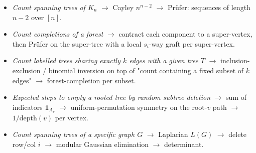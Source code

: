 
\begin{itemize}[nosep]
  \item \emph{Count spanning trees of \(K_n\)} \(\to\) Cayley \(n^{n-2}\)
        \(\to\) Pr\"ufer: sequences of length \(n-2\) over \([n]\).
  \item \emph{Count completions of a forest} \(\to\) contract each
        component to a super-vertex, then Pr\"ufer on the super-tree with
        a local \(s_i\)-way graft per super-vertex.
  \item \emph{Count labelled trees sharing exactly \(k\) edges with a
        given tree \(T\)} \(\to\) inclusion-exclusion / binomial inversion
        on top of "count containing a fixed subset of \(k\) edges"
        \(\to\) forest-completion per subset.
  \item \emph{Expected steps to empty a rooted tree by random subtree
        deletion} \(\to\) sum of indicators \(\mathbf{1}_{A_v}\)
        \(\to\) uniform-permutation symmetry on the root-\(v\) path
        \(\to\) \(1/\mathrm{depth}(v)\) per vertex.
  \item \emph{Count spanning trees of a specific graph \(G\)} \(\to\)
        Laplacian \(L(G)\) \(\to\) delete row/col \(i\) \(\to\)
        modular Gaussian elimination \(\to\) determinant.
\end{itemize}


